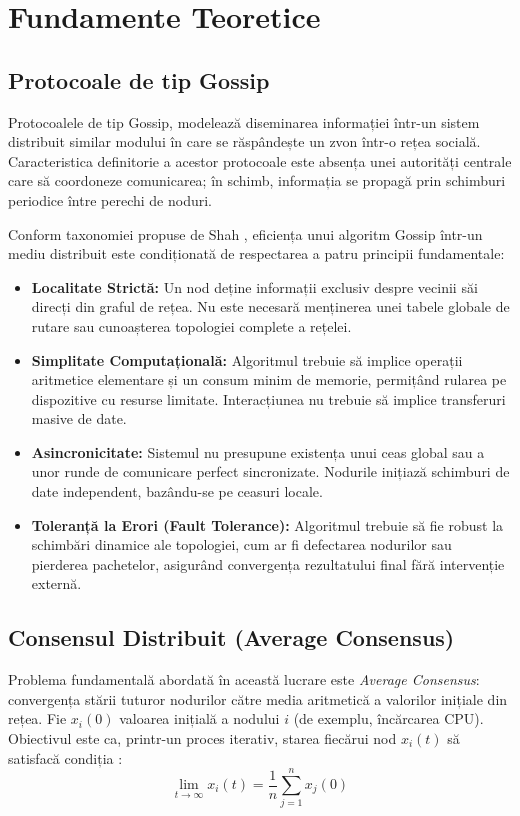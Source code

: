 \section{Fundamente Teoretice}
\label{sec:background}

\subsection{Protocoale de tip Gossip}
Protocoalele de tip Gossip, modelează diseminarea informației într-un sistem distribuit similar modului în care se răspândește un zvon într-o rețea socială. Caracteristica definitorie a acestor protocoale este absența unei autorități centrale care să coordoneze comunicarea; în schimb, informația se propagă prin schimburi periodice între perechi de noduri.

Conform taxonomiei propuse de Shah \cite{shah2009gossip}, eficiența unui algoritm Gossip într-un mediu distribuit este condiționată de respectarea a patru principii fundamentale:
\begin{itemize} 
    \item \textbf{Localitate Strictă:} Un nod deține informații exclusiv despre vecinii săi direcți din graful de rețea. Nu este necesară menținerea unei tabele globale de rutare sau cunoașterea topologiei complete a rețelei.
    \item \textbf{Simplitate Computațională:} Algoritmul trebuie să implice operații aritmetice elementare și un consum minim de memorie, permițând rularea pe dispozitive cu resurse limitate. Interacțiunea nu trebuie să implice transferuri masive de date.
    \item \textbf{Asincronicitate:} Sistemul nu presupune existența unui ceas global sau a unor runde de comunicare perfect sincronizate. Nodurile inițiază schimburi de date independent, bazându-se pe ceasuri locale.
    \item \textbf{Toleranță la Erori (Fault Tolerance):} Algoritmul trebuie să fie robust la schimbări dinamice ale topologiei, cum ar fi defectarea nodurilor sau pierderea pachetelor, asigurând convergența rezultatului final fără intervenție externă.
\end{itemize}

\subsection{Consensul Distribuit (Average Consensus)}
Problema fundamentală abordată în această lucrare este \textit{Average Consensus}: convergența stării tuturor nodurilor către media aritmetică a valorilor inițiale din rețea. Fie $x_i(0)$ valoarea inițială a nodului $i$ (de exemplu, încărcarea CPU). Obiectivul este ca, printr-un proces iterativ, starea fiecărui nod $x_i(t)$ să satisfacă condiția \cite{spanos2005dynamic}:
\[ \lim_{t \to \infty} x_i(t) = \frac{1}{n} \sum_{j=1}^{n} x_j(0) \]

